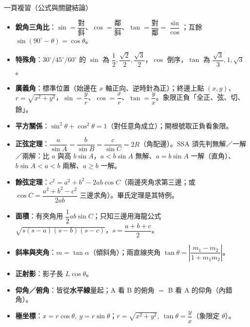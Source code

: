 \documentclass[11pt]{article}
\begin{document}
\begin{補充框}{一頁複習（公式與關鍵結論）}
\begin{itemize}\setlength{\itemsep}{2pt}
\item \textbf{銳角三角比}：$\sin=\dfrac{\text{對}}{\text{斜}}$、$\cos=\dfrac{\text{鄰}}{\text{斜}}$、$\tan=\dfrac{\text{對}}{\text{鄰}}=\dfrac{\sin}{\cos}$；互餘 $\sin(90^\circ-\theta)=\cos\theta$。
\item \textbf{特殊角}：$30^\circ/45^\circ/60^\circ$ 的 $\sin$ 為 $\dfrac12,\dfrac{\sqrt2}{2},\dfrac{\sqrt3}{2}$，$\cos$ 倒序，$\tan$ 為 $\dfrac{\sqrt3}{3},1,\sqrt3$。
\item \textbf{廣義角}：標準位置（始邊在 $x$ 軸正向、逆時針為正）；終邊上點 $(x,y)$、$r=\sqrt{x^2+y^2}$，$\sin=\dfrac{y}{r}$、$\cos=\dfrac{x}{r}$、$\tan=\dfrac{y}{x}$。象限正負「全正、弦、切、餘」。
\item \textbf{平方關係}：$\sin^2\theta+\cos^2\theta=1$（對任意角成立）；開根號取正負看象限。
\item \textbf{正弦定理}：$\dfrac{a}{\sin A}=\dfrac{b}{\sin B}=\dfrac{c}{\sin C}=2R$（角配邊）。SSA 須先判無解／一解／兩解：比 $a$ 與高 $b\sin A$，$a<b\sin A$ 無解、$a=b\sin A$ 一解（直角）、$b\sin A<a<b$ 兩解、$a\ge b$ 一解。
\item \textbf{餘弦定理}：$c^2=a^2+b^2-2ab\cos C$（兩邊夾角求第三邊；或 $\cos C=\dfrac{a^2+b^2-c^2}{2ab}$ 三邊求角）。畢氏定理是其特例。
\item \textbf{面積}：有夾角用 $\dfrac12ab\sin C$；只知三邊用海龍公式 $\sqrt{s(s-a)(s-b)(s-c)}$，$s=\dfrac{a+b+c}{2}$。
\item \textbf{斜率與夾角}：$m=\tan\alpha$（傾斜角）；兩直線夾角 $\tan\theta=\left|\dfrac{m_1-m_2}{1+m_1m_2}\right|$。
\item \textbf{正射影}：影子長 $L\cos\theta$。
\item \textbf{仰角／俯角}：皆從\textbf{水平線}量起；A 看 B 的俯角 $=$ B 看 A 的仰角（內錯角）。
\item \textbf{極坐標}：$x=r\cos\theta,\ y=r\sin\theta$；$r=\sqrt{x^2+y^2},\ \tan\theta=\dfrac{y}{x}$（象限定 $\theta$）。
\end{itemize}
\end{補充框}
\end{document}
